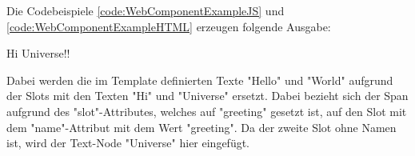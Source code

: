 \pagebreak
{}




Die Codebeispiele \ref{code:WebComponentExampleJS} und \ref{code:WebComponentExampleHTML} erzeugen folgende Ausgabe:

{\ttfamily Hi Universe!!}

Dabei werden die im Template definierten Texte "Hello" und "World" aufgrund der Slots mit den Texten "Hi" und "Universe" ersetzt. 
Dabei bezieht sich der Span aufgrund des "{\ttfamily slot}"-Attributes, welches auf "greeting" gesetzt ist, auf den Slot mit dem "{\ttfamily name}"-Attribut mit dem Wert "greeting". 
Da der zweite Slot ohne Namen ist, wird der Text-Node "Universe" hier eingefügt.